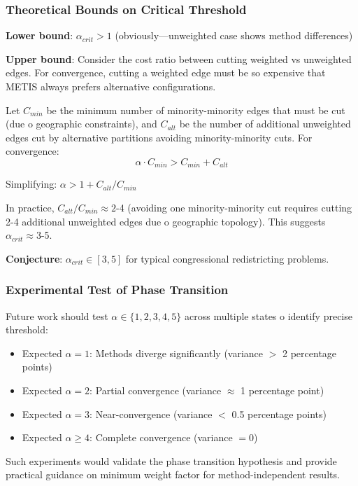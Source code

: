 \subsubsection{Theoretical Bounds on Critical Threshold}

\textbf{Lower bound}: $\alpha_{crit} > 1$ (obviously—unweighted case shows method differences)

\textbf{Upper bound}: Consider the cost ratio between cutting weighted vs unweighted edges. For convergence, cutting a weighted edge must be so expensive that METIS always prefers alternative configurations.

Let $C_{min}$ be the minimum number of minority-minority edges that must be cut (due 	o geographic constraints), and $C_{alt}$ be the number of additional unweighted edges cut by alternative partitions avoiding minority-minority cuts. For convergence:
\begin{equation}
\alpha \cdot C_{min} > C_{min} + C_{alt}
\end{equation}

Simplifying: $\alpha > 1 + C_{alt}/C_{min}$

In practice, $C_{alt}/C_{min} \approx 2$-4 (avoiding one minority-minority cut requires cutting 2-4 additional unweighted edges due 	o geographic topology). This suggests $\alpha_{crit} \approx 3$-5.

\textbf{Conjecture}: $\alpha_{crit} \in [3, 5]$ for typical congressional redistricting problems.

\subsubsection{Experimental Test of Phase Transition}

Future work should test $\alpha \in \{1, 2, 3, 4, 5\}$ across multiple states 	o identify precise threshold:
\begin{itemize}
\item Expected $\alpha = 1$: Methods diverge significantly (variance $>$ 2 percentage points)
\item Expected $\alpha = 2$: Partial convergence (variance $\approx$ 1 percentage point)
\item Expected $\alpha = 3$: Near-convergence (variance $<$ 0.5 percentage points)
\item Expected $\alpha \geq 4$: Complete convergence (variance $= 0$)
\end{itemize}

Such experiments would validate the phase transition hypothesis and provide practical guidance on minimum weight factor for method-independent results.

